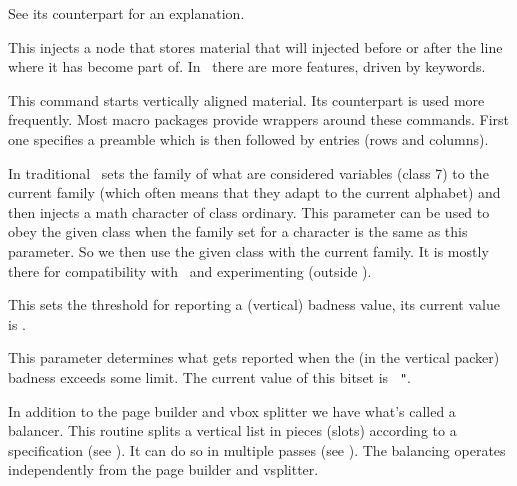 See its counterpart  for an explanation.

\stopoldprimitive

\startoldprimitive[title={\prm {vadjust}}]

This injects a node that stores material that will injected before or after the
line where it has become part of. In \LUAMETATEX\ there are more features, driven
by keywords.

\stopoldprimitive

\startoldprimitive[title={\prm {valign}}]

This command starts vertically aligned material. Its counterpart  is
used more frequently. Most macro packages provide wrappers around these commands.
First one specifies a preamble which is then followed by entries (rows and
columns).

\stopoldprimitive

\startnewprimitive[title={\prm {variablefam}}]

In traditional \TEX\ sets the family of what are considered variables (class 7)
to the current family (which often means that they adapt to the current alphabet)
and then injects a math character of class ordinary. This parameter can be used
to obey the given class when the family set for a character is the same as this
parameter. So we then use the given class with the current family. It is mostly
there for compatibility with \LUATEX\ and experimenting (outside \CONTEXT).

\stopnewprimitive

\startoldprimitive[title={\prm {vbadness}}]

This sets the threshold for reporting a (vertical) badness value, its current
value is \the \badness.

\stopoldprimitive

\startnewprimitive[title={\prm {vbadnessmode}}]

This parameter determines what gets reported when the (in the vertical packer)
badness exceeds some limit. The current value of this bitset is {\tt
"\tohexadecimal \vbadnessmode}.

\startfourrows
{}
\stopfourrows

\stopnewprimitive

\startnewprimitive[title={\prm {vbalance}}]

In addition to the page builder and vbox splitter we have what's called a
balancer. This routine splits a vertical list in pieces (slots) according to a
specification (see \typ {\balanceshape}). It can do so in multiple passes (see
\typ {\balancepasses}). The balancing  operates independently
from the page builder and vsplitter.

